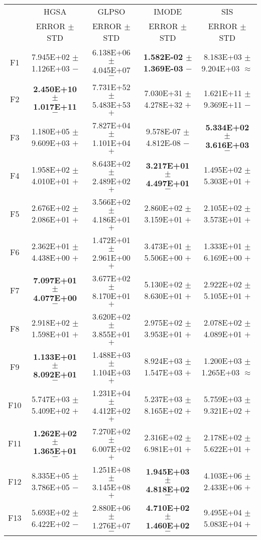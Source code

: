 \documentclass[paper]{ieice}
\begin{document}
\begin{table*}[htbp]
\begin{tabular}{c|c|c|c|c}
		&	HGSA				&	GLPSO				&	IMODE				&	SIS				\\   \cline{2-5}
		&	ERROR	$\pm$	STD		&	ERROR	$\pm$	STD		&	ERROR	$\pm$	STD		&	ERROR	$\pm$	STD		\\ \hline
		F1	&	7.945E+02	$\pm$	1.126E+03	$-$	&	6.138E+06	$\pm$	4.045E+07	$-$	&	\textbf{1.582E-02	$\pm$	1.369E-03}	$-$	&	8.183E+03	$\pm$	9.204E+03	$\approx$	\\
		F2	&	\textbf{2.450E+10	$\pm$	1.017E+11}	$-$	&	7.731E+52	$\pm$	5.483E+53	$+$	&	7.030E+31	$\pm$	4.278E+32	$+$	&	1.621E+11	$\pm$	9.369E+11	$-$	\\
		F3	&	1.180E+05	$\pm$	9.609E+03	$+$	&	7.827E+04	$\pm$	1.101E+04	$+$	&	9.578E-07	$\pm$	4.812E-08	$-$	&	\textbf{5.334E+02	$\pm$	3.616E+03}	$-$	\\
		F4	&	1.958E+02	$\pm$	4.010E+01	$+$	&	8.643E+02	$\pm$	2.489E+02	$+$	&	\textbf{3.217E+01	$\pm$	4.497E+01}	$-$	&	1.495E+02	$\pm$	5.303E+01	$+$	\\
		F5	&	2.676E+02	$\pm$	2.086E+01	$+$	&	3.566E+02	$\pm$	4.186E+01	$+$	&	2.860E+02	$\pm$	3.159E+01	$+$	&	2.105E+02	$\pm$	3.573E+01	$+$	\\
		F6	&	2.362E+01	$\pm$	4.438E+00	$+$	&	1.472E+01	$\pm$	2.961E+00	$+$	&	3.473E+01	$\pm$	5.506E+00	$+$	&	1.333E+01	$\pm$	6.169E+00	$+$	\\
		F7	&	\textbf{7.097E+01	$\pm$	4.077E+00}	$-$	&	3.677E+02	$\pm$	8.170E+01	$+$	&	5.130E+02	$\pm$	8.630E+01	$+$	&	2.922E+02	$\pm$	5.105E+01	$+$	\\
		F8	&	2.918E+02	$\pm$	1.598E+01	$+$	&	3.620E+02	$\pm$	3.855E+01	$+$	&	2.975E+02	$\pm$	3.953E+01	$+$	&	2.078E+02	$\pm$	4.089E+01	$+$	\\
		F9	&	\textbf{1.133E+01	$\pm$	8.092E+01}	$-$	&	1.488E+03	$\pm$	1.104E+03	$+$	&	8.924E+03	$\pm$	1.547E+03	$+$	&	1.200E+03	$\pm$	1.265E+03	$\approx$	\\
		F10	&	5.747E+03	$\pm$	5.409E+02	$+$	&	1.231E+04	$\pm$	4.412E+02	$+$	&	5.237E+03	$\pm$	8.165E+02	$+$	&	5.759E+03	$\pm$	9.321E+02	$+$	\\
		F11	&	\textbf{1.262E+02	$\pm$	1.365E+01}	$-$	&	7.270E+02	$\pm$	6.007E+02	$+$	&	2.316E+02	$\pm$	6.981E+01	$+$	&	2.178E+02	$\pm$	5.622E+01	$+$	\\
		F12	&	8.335E+05	$\pm$	3.786E+05	$-$	&	1.251E+08	$\pm$	3.145E+08	$+$	&	\textbf{1.945E+03	$\pm$	4.818E+02}	$-$	&	4.103E+06	$\pm$	2.433E+06	$+$	\\
		F13	&	5.693E+02	$\pm$	6.422E+02	$-$	&	2.880E+06	$\pm$	1.276E+07	$-$	&	\textbf{4.710E+02	$\pm$	1.460E+02}	$-$	&	9.495E+04	$\pm$	5.083E+04	$+$	\\

\end{tabular}
\end{table*}
\end{document}
